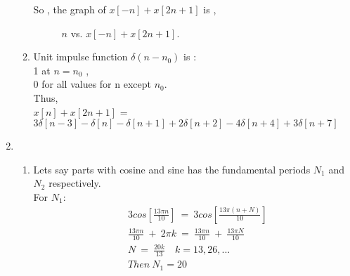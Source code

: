 \documentclass[10pt,a4paper, margin=1in]{article}
\begin{document}
\begin{enumerate}
\begin{enumerate}
So , the graph of $x[-n] + x[2n+1]$ is ,

\begin{figure} [H]
    \centering
    \caption{$n$ vs. $x[-n]+ x[2n+1]$.}
    \label{fig:q3}
\end{figure}

    \item %
    
    Unit impulse function $\delta(n-n_0)$ is :\\
    1 at $n = n_0$ , \\
    0 for all values for n except $n_0$.\\
    
    Thus,\\
    $x[n]+ x[2n+1]$  =  $3\delta[n-3]-\delta[n]-\delta[n+1]+2\delta[n+2]-4\delta[n+4]+3\delta[n+7]$ \\
    
    \end{enumerate}

\item 
    \begin{enumerate}
    \item %
    Lets say parts with cosine and sine has the fundamental periods $N_1$ and $N_2$ respectively. \\
    For $N_1$: \\  
    \begin{align*}
    &3cos[\frac{13 \pi n}{10}] \ = \ 3cos[\frac{13 \pi (n+N)}{10}] \\
    &\frac{13 \pi n}{10} \ + \ 2 \pi k \ = \ \frac{13 \pi n}{10} \ + \ \frac{13 \pi N}{10} \\
    &N \ = \ \frac{20k}{13} \quad k=13,26,... \\
    &Then \ N_1 = 20 \\
    \end{align*}
    

\end{enumerate}
\end{enumerate}
\end{document}
